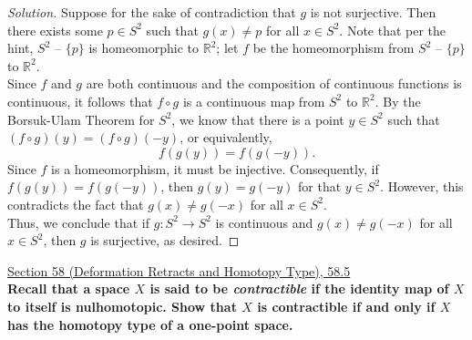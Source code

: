 \documentclass[11pt]{article}
\newcommand{\R}{\mathbb{R}}
\newenvironment{solution}
  {\renewcommand\qedsymbol{$\blacksquare$}\begin{proof}[Solution]}
  {\end{proof}}
\begin{document}
\begin{solution}
Suppose for the sake of contradiction that $g$ is not surjective. Then there exists some $p \in S^2$ such that $g(x) \neq p$ for all $x \in S^2$. Note that per the hint,  $S^2 \text{ -- } \{ p \}$ is homeomorphic to $\R^2$; 
let $f$ be the homeomorphism from $S^2 \text{ -- } \{ p \}$ to $\R^2$. \\

Since $f$ and $g$ are both continuous and the composition of continuous functions is continuous, it follows that $f \circ g$ is a continuous map from $S^2$ to $\R^2$. 
By the Borsuk-Ulam Theorem for $S^2$, we know that there is a point $y \in S^2$ such that $(f \circ g)(y) = (f \circ g)(-y)$, or equivalently,
\[
    f(g(y)) = f(g(-y)).
\]
Since $f$ is a homeomorphism, it must be injective. Consequently, if $f(g(y)) = f(g(-y))$, then $g(y) = g(-y)$ for that $y \in S^2$. However, this contradicts the fact that $g(x) \neq g(-x)$ for all $x \in S^2$. \\

Thus, we conclude that if $g\colon S^2 \rightarrow S^2$ is continuous and $g(x) \neq g(-x)$ for all $x \in S^2$, then $g$ is surjective, as desired.\end{solution}

\newpage

\underline{Section 58 (Deformation Retracts and Homotopy Type), 58.5} \\

\textbf{Recall that a space $X$ is said to be \textit{contractible} if the identity map of $X$ to itself is nulhomotopic. Show that $X$ is contractible if and only if $X$ has the homotopy type of a one-point space.}
\end{document}
